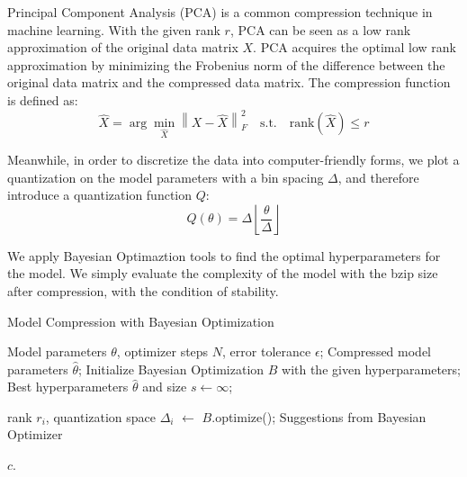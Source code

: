 \documentclass{article}
\begin{document}
Principal Component Analysis (PCA) is a common compression technique in machine learning. With the given rank $r$, PCA can be seen as a low rank approximation of the original data matrix $X$. PCA acquires the optimal low rank approximation by minimizing the Frobenius norm of the difference between the original data matrix and the compressed data matrix. The compression function is defined as:
$$
\hat{X} = \arg\min_{\hat{X}} \left\| X - \hat{X} \right\|_F^2 \quad \text{s.t.} \quad \text{rank}(\hat{X}) \le r
$$

Meanwhile, in order to discretize the data into computer-friendly forms, we plot a quantization on the model parameters with a bin spacing $\Delta$, and therefore introduce a quantization function $Q$:
$$
Q(\theta) = \Delta \left\lfloor \frac{\theta}{\Delta} \right\rfloor
$$

We apply Bayesian Optimaztion tools to find the optimal hyperparameters for the model. We simply evaluate the complexity of the model with the bzip size after compression, with the condition of stability.


\begin{algorithm}[!ht]
    \renewcommand{\algorithmicrequire}{\textbf{Input:}}
    \renewcommand{\algorithmicensure}{\textbf{Output:}}
    \caption{Model Compression with Bayesian Optimization}
    \label{ADMM}
    \begin{algorithmic}[1]
        \Require Model parameters $\theta$, optimizer steps $N$, error tolerance $\epsilon$;
        \Ensure Compressed model parameters $\hat{\theta}$;
        \State Initialize Bayesian Optimization $B$ with the given hyperparameters;
        \State Best hyperparameters $\hat{\theta}$ and size $s \leftarrow \infty$;
    
    
    
        \State rank $r_i$, quantization space $\Delta_i$ $\leftarrow$ $B$.optimize();
        \Comment Suggestions from Bayesian Optimizer

        \EndFor
  
        \State \Return $c$.
 \end{algorithmic}
\end{algorithm}
\end{document}
